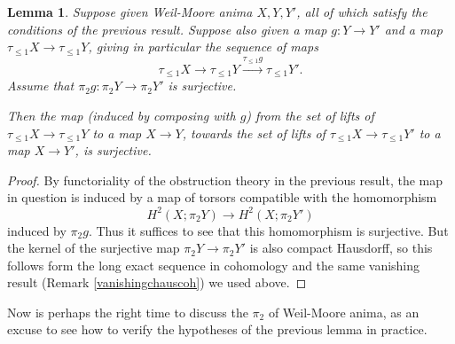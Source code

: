 \documentclass[12pt]{article}
\newtheorem{lemma}[theorem]{Lemma}
\theoremstyle{definition}
\begin{document}
\begin{lemma}
Suppose given Weil-Moore anima $X,Y,Y'$, all of which satisfy the conditions of the previous result.  Suppose also given a map $g:Y\to Y'$ and a map $\tau_{\leq 1}X\to\tau_{\leq 1}Y$, giving in particular the sequence of maps
$$\tau_{\leq 1}X \to \tau_{\leq 1}Y \overset{\tau_{\leq 1}g}{\longrightarrow} \tau_{\leq 1} Y'.$$
Assume that $\pi_2g:\pi_2Y\to\pi_2Y'$ is surjective.

Then the map (induced by composing with $g$) from the set of lifts of $\tau_{\leq 1}X \to \tau_{\leq 1}Y$ to a map $X\to Y$, towards the set of lifts of $\tau_{\leq 1}X \to \tau_{\leq 1}Y'$ to a map $X \to Y'$, is surjective.

\end{lemma}
\begin{proof}
By functoriality of the obstruction theory in the previous result, the map in question is induced by a map of torsors compatible with the homomorphism
$$H^2(X;\pi_2Y) \to H^2(X;\pi_2Y')$$
induced by $\pi_2g$. Thus it suffices to see that this homomorphism is surjective.  But the kernel of the surjective map $\pi_2Y\to \pi_2Y'$ is also compact Hausdorff, so this follows form the long exact sequence in cohomology and the same vanishing result (Remark \ref{vanishingchauscoh}) we used above.
\end{proof}

Now is perhaps the right time to discuss the $\pi_2$ of Weil-Moore anima, as an excuse to see how to verify the hypotheses of the previous lemma in practice.
\end{document}
